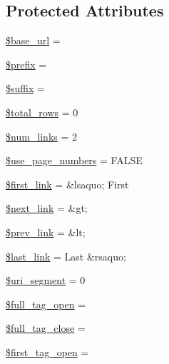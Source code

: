 \subsection*{Protected Attributes}
\begin{DoxyCompactItemize}
\item 
\hyperlink{class_c_i___pagination_a6886427c9c643f707fcb35c018049bc7}{\$base\+\_\+url} = \textquotesingle{}\textquotesingle{}
\item 
\hyperlink{class_c_i___pagination_a09e8cf95b9d29955a0bfabca9b420edc}{\$prefix} = \textquotesingle{}\textquotesingle{}
\item 
\hyperlink{class_c_i___pagination_a8a4ee1ac7ecdf8ef590598ad43b23e0a}{\$suffix} = \textquotesingle{}\textquotesingle{}
\item 
\hyperlink{class_c_i___pagination_af2c641e024ee7eeec68ae26c08ca2cf2}{\$total\+\_\+rows} = 0
\item 
\hyperlink{class_c_i___pagination_aa04c33b46d7b63638408ac57ca3ee9e9}{\$num\+\_\+links} = 2
\item 
\hyperlink{class_c_i___pagination_ac19b7d290389a9188ca6466f85d14a85}{\$use\+\_\+page\+\_\+numbers} = F\+A\+L\+S\+E
\item 
\hyperlink{class_c_i___pagination_a0236d9345031b8c11db487560609f9a7}{\$first\+\_\+link} = \textquotesingle{}\&lsaquo; First\textquotesingle{}
\item 
\hyperlink{class_c_i___pagination_ae3962413e69384df902aedf7484ddefe}{\$next\+\_\+link} = \textquotesingle{}\&gt;\textquotesingle{}
\item 
\hyperlink{class_c_i___pagination_afab5c29a3da82c4dce6a491f1d257831}{\$prev\+\_\+link} = \textquotesingle{}\&lt;\textquotesingle{}
\item 
\hyperlink{class_c_i___pagination_ab10d1c6de63d2bc11a210c26e450b231}{\$last\+\_\+link} = \textquotesingle{}Last \&rsaquo;\textquotesingle{}
\item 
\hyperlink{class_c_i___pagination_a79fd9718cc6c432f6919c28299584d77}{\$uri\+\_\+segment} = 0
\item 
\hyperlink{class_c_i___pagination_a75336a53727415578f78bd3d337c8559}{\$full\+\_\+tag\+\_\+open} = \textquotesingle{}\textquotesingle{}
\item 
\hyperlink{class_c_i___pagination_ad7e8fd7ace07539860b6f0b323aacbc8}{\$full\+\_\+tag\+\_\+close} = \textquotesingle{}\textquotesingle{}
\item 
\hyperlink{class_c_i___pagination_a5e352cfb5a6e9b6f850264aca68f00e0}{\$first\+\_\+tag\+\_\+open} = \textquotesingle{}\textquotesingle{}

\end{DoxyCompactItemize}

